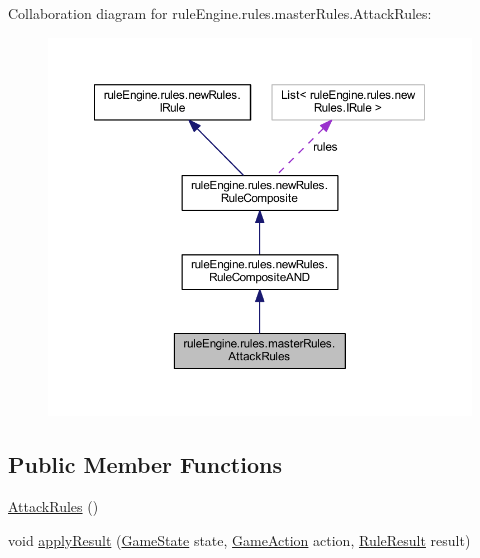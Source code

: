 Collaboration diagram for rule\+Engine.\+rules.\+master\+Rules.\+Attack\+Rules\+:
\nopagebreak
\begin{figure}[H]
\begin{center}
\leavevmode
\includegraphics[width=350pt]{classrule_engine_1_1rules_1_1master_rules_1_1_attack_rules__coll__graph}
\end{center}
\end{figure}
\subsection*{Public Member Functions}
\begin{DoxyCompactItemize}
\item 
\mbox{\hyperlink{classrule_engine_1_1rules_1_1master_rules_1_1_attack_rules_abff281f832282088921c75c1c35a9310}{Attack\+Rules}} ()
\item 
void \mbox{\hyperlink{classrule_engine_1_1rules_1_1master_rules_1_1_attack_rules_ae45bbf8fb4c1cef3733c6051f8b8b008}{apply\+Result}} (\mbox{\hyperlink{classgame_1_1game_state_1_1_game_state}{Game\+State}} state, \mbox{\hyperlink{classrule_engine_1_1_game_action}{Game\+Action}} action, \mbox{\hyperlink{classrule_engine_1_1_rule_result}{Rule\+Result}} result)
\end{DoxyCompactItemize}
